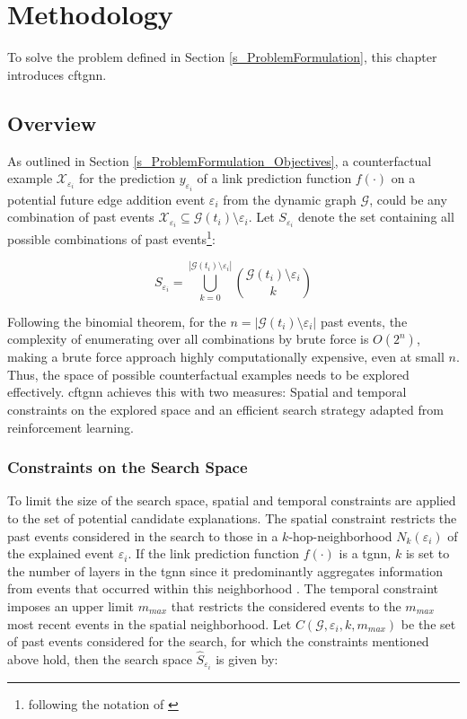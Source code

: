 \section{Methodology}
\label{s_Methodology}

To solve the problem defined in Section \ref{s_ProblemFormulation}, this chapter introduces \gls{cftgnn}. 

\subsection{Overview}
\label{s_Methodology_Overview}

As outlined in Section \ref{s_ProblemFormulation_Objectives}, a counterfactual example $\mathcal{X}_{\varepsilon_i}$ for the prediction $y_{\varepsilon_i}$ of a link prediction function $f(\cdot)$ on a potential future edge addition event $\varepsilon_i$ from the dynamic graph $\mathcal{G}$, could be any combination of past events $\mathcal{X}_{\varepsilon_i} \subseteq \mathcal{G}(t_i) \setminus \varepsilon_i$. Let $S_{\varepsilon_i}$ denote the set containing all possible combinations of past events\footnote{following the notation of \cite{stanley_enumerative_1986}}:

\begin{equation}
    S_{\varepsilon_i} = \bigcup_{k = 0}^{|\mathcal{G}(t_i) \setminus \varepsilon_i|} {\mathcal{G}(t_i) \setminus \varepsilon_i \choose k}
\end{equation}

Following the binomial theorem, for the $n = |\mathcal{G}(t_i) \setminus \varepsilon_i|$ past events, the complexity of enumerating over all combinations by brute force is $O(2^n)$, making a brute force approach highly computationally expensive, even at small $n$. Thus, the space of possible counterfactual examples needs to be explored effectively. \gls{cftgnn} achieves this with two measures: Spatial and temporal constraints on the explored space and an efficient search strategy adapted from reinforcement learning.

\subsubsection{Constraints on the Search Space}
\label{s_Methodology_Overview_Constraints}
To limit the size of the search space, spatial and temporal constraints are applied to the set of potential candidate explanations. The spatial constraint restricts the past events considered in the search to those in a $k$-hop-neighborhood $N_k(\varepsilon_i)$ of the explained event $\varepsilon_i$. If the link prediction function $f(\cdot)$ is a \gls{tgnn}, $k$ is set to the number of layers in the \gls{tgnn} since it predominantly aggregates information from events that occurred within this neighborhood \cite{yuan_explainability_2021}. The temporal constraint imposes an upper limit $m_{max}$ that restricts the considered events to the $m_{max}$ most recent events in the spatial neighborhood. Let $C(\mathcal{G}, \varepsilon_i, k, m_{max})$ be the set of past events considered for the search, for which the constraints mentioned above hold, then the search space $\hat{S}_{\varepsilon_i}$ is given by:

